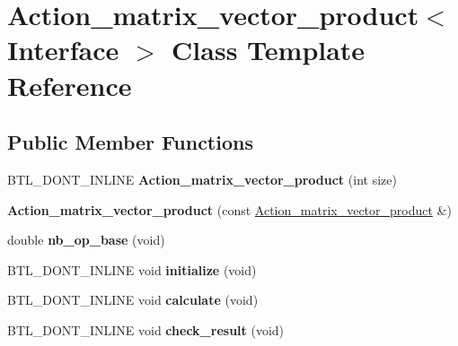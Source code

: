 \hypertarget{class_action__matrix__vector__product}{}\section{Action\+\_\+matrix\+\_\+vector\+\_\+product$<$ Interface $>$ Class Template Reference}
\label{class_action__matrix__vector__product}
\subsection*{Public Member Functions}
\begin{DoxyCompactItemize}
\item 
\mbox{\label{class_action__matrix__vector__product_af9d672e301603bf4115830d62cb08599}} 
B\+T\+L\+\_\+\+D\+O\+N\+T\+\_\+\+I\+N\+L\+I\+NE {\bfseries Action\+\_\+matrix\+\_\+vector\+\_\+product} (int size)
\item 
\mbox{\label{class_action__matrix__vector__product_af9cd6ed610de887f591ca52d081e5571}} 
{\bfseries Action\+\_\+matrix\+\_\+vector\+\_\+product} (const \hyperlink{class_action__matrix__vector__product}{Action\+\_\+matrix\+\_\+vector\+\_\+product} \&)
\item 
\mbox{\label{class_action__matrix__vector__product_a53c3279dd4a5be43f1bee18f015dd962}} 
double {\bfseries nb\+\_\+op\+\_\+base} (void)
\item 
\mbox{\label{class_action__matrix__vector__product_aad3d4a1a36d274973c3e30c83c38c914}} 
B\+T\+L\+\_\+\+D\+O\+N\+T\+\_\+\+I\+N\+L\+I\+NE void {\bfseries initialize} (void)
\item 
\mbox{\label{class_action__matrix__vector__product_a4a0ab0613498abd6231f47ce14f87ff9}} 
B\+T\+L\+\_\+\+D\+O\+N\+T\+\_\+\+I\+N\+L\+I\+NE void {\bfseries calculate} (void)
\item 
\mbox{\label{class_action__matrix__vector__product_a7679cb2041b51eb79e6ad813af161a3b}} 
B\+T\+L\+\_\+\+D\+O\+N\+T\+\_\+\+I\+N\+L\+I\+NE void {\bfseries check\+\_\+result} (void)

\end{DoxyCompactItemize}
